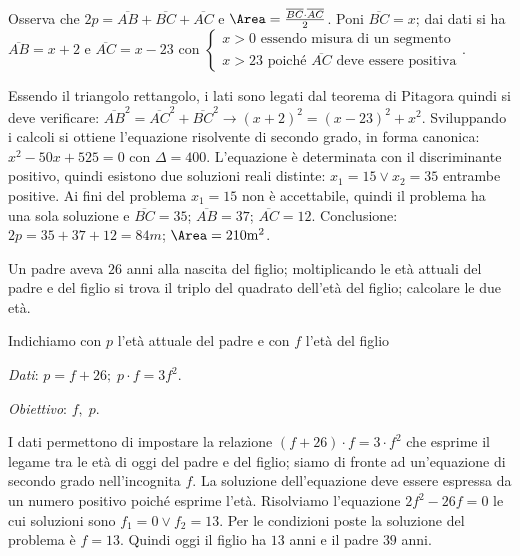\begin{soluzione}

Osserva che $2 p = \overline {AB} + \overline {BC} + \overline {AC}$ e $\Area =\frac{\overline {BC} \cdot \overline {AC}}{2}$.
Poni $\overline {BC} = x$; dai dati si ha $\overline {AB} = x + 2$ e $\overline{AC} = x - 23$ con
$\left\{\begin{array}{l} x > 0 \text{ essendo misura di un segmento} \\x >23 \text{ poiché } \overline {AC} \text{ deve essere positiva}
\end{array}\right.$.

Essendo il triangolo rettangolo, i lati sono legati dal teorema di Pitagora
quindi si deve verificare: $\overline {AB}^{2}= \overline {AC}^{2} + \overline {BC}^{2}\rightarrow ( x + 2 )^{2} = ( x - 23 )^{2} + x^{2}$. Sviluppando i calcoli si ottiene l'equazione risolvente di secondo grado, in forma canonica: $x^{2} - 50 x + 525 = 0 \text{ con } \Delta = 400$. L’equazione è determinata con il discriminante positivo, quindi esistono due soluzioni reali distinte: $x_{1} = 15 \vee x_{2} = 35$ entrambe positive. Ai fini del problema $x_{1} = 15$ non è accettabile, quindi il problema ha una sola soluzione e $\overline {BC} = 35$; $\overline {AB} = 37$; $\overline {AC} = 12$. Conclusione: $2 p = 35 + 37 + 12 = 84\unit{m}$; $ \Area = 210\unit{m^{2}}$.
\end{soluzione}

\begin{problema}
Un padre aveva $26$ anni alla nascita del figlio; moltiplicando le età attuali del padre e del figlio si trova il triplo del quadrato dell’età del figlio; calcolare le due età.
\end{problema}
Indichiamo con $p$ l’età attuale del padre e con $f$ l’età del figlio

\emph{Dati}: $p = f + 26;\; p \cdot f = 3 f^{2}$.

\emph{Obiettivo}: $f,\; p$.

\begin{soluzione}
I dati permettono di impostare la relazione $(f + 26) \cdot f = 3 \cdot f^{2}$ che esprime il legame tra le età di oggi del padre e del figlio; siamo di
fronte ad un'equazione di secondo grado nell’incognita $f$. La soluzione dell’equazione deve essere espressa da un numero positivo poiché esprime l'età.
Risolviamo l'equazione $2 f^{2} - 26 f = 0$ le cui soluzioni sono $f_{1} = 0 \vee f_{2} = 13$. Per le condizioni poste la soluzione del problema è
$f = 13$. Quindi oggi il figlio ha $13$ anni e il padre $39$ anni.
\end{soluzione}

